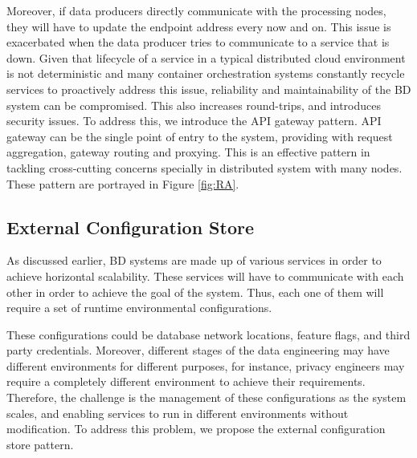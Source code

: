 \documentclass[a4paper,11pt,article,oneside]{memoir}
\begin{document}


Moreover, if data producers directly communicate with the processing nodes, they will have to update the endpoint address every now and on. This issue is exacerbated when the data producer tries to communicate to a service that is down. Given that lifecycle of a service in a typical distributed cloud environment is not deterministic and many container orchestration systems constantly recycle services to proactively address this issue, reliability and maintainability of the BD system can be compromised. This also increases round-trips, and introduces security issues. To address this, we introduce the API gateway pattern. API gateway can be the single point of entry to the system, providing with request aggregation, gateway routing and proxying. This is an effective pattern in tackling cross-cutting concerns specially in distributed system with many nodes. These pattern are portrayed in Figure \ref{fig:RA}. 


\subsection{External Configuration Store}

As discussed earlier, BD systems are made up of various services in order to achieve horizontal scalability. These services will have to communicate with each other in order to achieve the goal of the system. Thus, each one of them will require a set of runtime environmental configurations. 

These configurations could be database network locations, feature flags, and third party credentials. Moreover, different stages of the data engineering may have different environments for different purposes, for instance, privacy engineers may require a completely different environment to achieve their requirements. Therefore, the challenge is the management of these configurations as the system scales, and enabling services to run in different environments without modification. To address this problem, we propose the external configuration store pattern.
\end{document}
